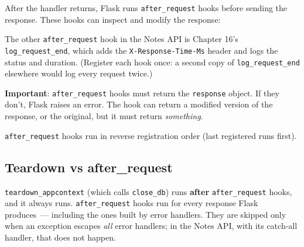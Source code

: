 After the handler returns, Flask runs \texttt{after\_request} hooks before sending the response. These hooks can inspect and modify the response:

\begin{codebox}[short]

\begin{Shaded}
\begin{Highlighting}[]

       
\NormalTok{        response.headers[}\NormalTok{] }\OperatorTok{=} 
\end{Highlighting}
\end{Shaded}

\end{codebox}

\noindent{}The other \texttt{after\_request} hook in the Notes API is Chapter 16's \texttt{log\_request\_end}, which adds the \texttt{X-Response-Time-Ms} header and logs the status and duration. (Register each hook once: a second copy of \texttt{log\_request\_end} elsewhere would log every request twice.)

\textbf{Important}: \texttt{after\_request} hooks must return the \texttt{response} object. If they don't, Flask raises an error. The hook can return a modified version of the response, or the original, but it must return \emph{something}.

\texttt{after\_request} hooks run in reverse registration order (last registered runs first).

\subsection*{Teardown vs after\_request}\label{34-response-handling:teardown-vs-after-request}

\texttt{teardown\_appcontext} (which calls \texttt{close\_db}) runs \textbf{after} \texttt{after\_request} hooks, and it always runs. \texttt{after\_request} hooks run for every response Flask produces~--- including the ones built by error handlers. They are skipped only when an exception escapes \emph{all} error handlers; in the Notes API, with its catch-all handler, that does not happen.

